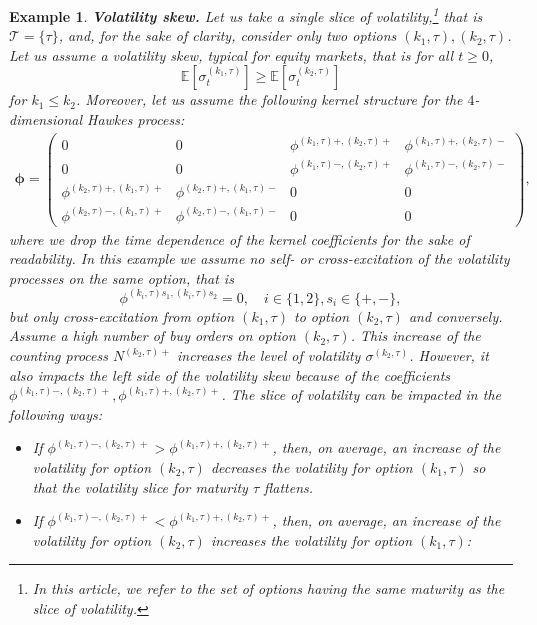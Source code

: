 \documentclass[12pt]{article}
\newtheorem{example}[theorem2]{Example}
\begin{document}
\begin{example}\label{example_skew}
\textbf{Volatility skew.} Let us take a single slice of volatility,\footnote{In this article, we refer to  the set of options having the same maturity as the slice of volatility.} that is $\mathcal{T}=\{\tau\}$, and, for the sake of clarity, consider only two options $(k_1,\tau),(k_2,\tau)$. Let us assume a volatility skew, typical for equity markets, that is for all $t\geq0$, \[\mathbb{E}[\sigma_t^{(k_1,\tau)}] \geq \mathbb{E}[\sigma_t^{(k_2,\tau)}]\] for $k_1\leq k_2$. Moreover, let us assume the following kernel structure for the $4$-dimensional Hawkes process:
\begin{align*}
\boldsymbol{\phi} = 
\begin{pmatrix}
    0 & 0 & \phi^{(k_1,\tau)+,(k_2,\tau)+} & \phi^{(k_1,\tau)+,(k_2,\tau)-} \\
    0 & 0 & \phi^{(k_1,\tau)-,(k_2,\tau)+} & \phi^{(k_1,\tau)-,(k_2,\tau)-} \\
    \phi^{(k_2,\tau)+,(k_1,\tau)+} & \phi^{(k_2,\tau)+,(k_1,\tau)-} & 0 & 0 \\
    \phi^{(k_2,\tau)-,(k_1,\tau)+} & \phi^{(k_2,\tau)-,(k_1,\tau)-} & 0 & 0
\end{pmatrix},
\end{align*}
where we drop the time dependence of the kernel coefficients for the sake of readability. In this example we assume no self- or cross-excitation of the volatility processes on the same option, that is
\[\phi^{(k_i,\tau)s_1,(k_i,\tau)s_2} =0, \quad i\in \{1,2\}, s_i\in\{+,-\},\]
but only cross-excitation from option $(k_1,\tau)$ to option $(k_2,\tau)$ and conversely. Assume a high number of buy orders on option $(k_2,\tau)$. This increase of the counting process $N^{(k_2,\tau)+}$ increases the level of volatility $\sigma^{(k_2,\tau)}$. However, it also impacts the left side of the volatility skew because of the coefficients $\phi^{(k_1,\tau)-,(k_2,\tau)+},\phi^{(k_1,\tau)+,(k_2,\tau)+}$. The slice of volatility can be impacted in the following ways:
\begin{itemize}
    \item If $\phi^{(k_1,\tau)-,(k_2,\tau)+}>\phi^{(k_1,\tau)+,(k_2,\tau)+}$, then, on average, an increase of the volatility for option $(k_2,\tau)$ decreases the volatility for option $(k_1,\tau)$ so that the volatility slice for maturity $\tau$ flattens. 
    \item If $\phi^{(k_1,\tau)-,(k_2,\tau)+}<\phi^{(k_1,\tau)+,(k_2,\tau)+}$, then, on average, an increase of the volatility for option $(k_2,\tau)$ increases the volatility for option $(k_1,\tau)$:

\end{itemize}
\end{example}
\end{document}
